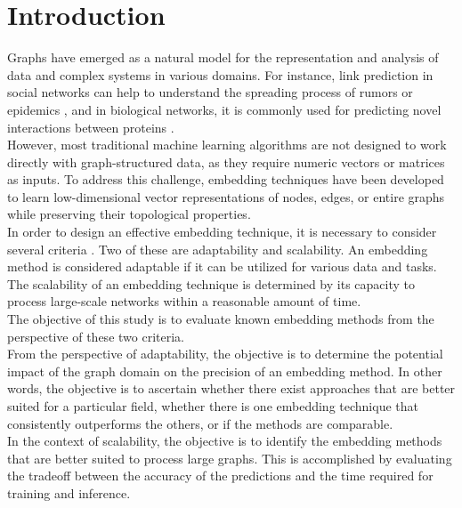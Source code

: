 \section{Introduction}
Graphs have emerged as a natural model for the representation and analysis of data and complex systems in various domains. 
For instance, link prediction in social networks can help to understand the spreading process of rumors or epidemics \cite{pastor2015epidemic}, and in biological networks, it is commonly used for predicting novel interactions between proteins \cite{junker2008analysis}. 
\\
However, most traditional machine learning algorithms are not designed to work directly with graph-structured data, as they require numeric vectors or matrices as inputs.
To address this challenge, embedding techniques have been developed to learn low-dimensional vector representations of nodes, edges, or entire graphs while preserving their topological properties. 
\\
In order to design an effective embedding technique, it is necessary to consider several criteria \cite{baptista2023zoo}. 
Two of these are adaptability and scalability.
An embedding method is considered adaptable if it can be utilized for various data and tasks.
The scalability of an embedding technique is determined by its capacity to process large-scale networks within a reasonable amount of time. 
\\\newline
The objective of this study is to evaluate known embedding methods from the perspective of these two criteria. 
\\
From the perspective of adaptability, the objective is to determine the potential impact of the graph domain on the precision of an embedding method.
In other words, the objective is to ascertain whether there exist approaches that are better suited for a particular field, whether there is one embedding technique that consistently outperforms the others, or if the methods are comparable.
\\
In the context of scalability, the objective is to identify the embedding methods that are better suited to process large graphs. 
This is accomplished by evaluating the tradeoff between the accuracy of the predictions and the time required for training and inference.